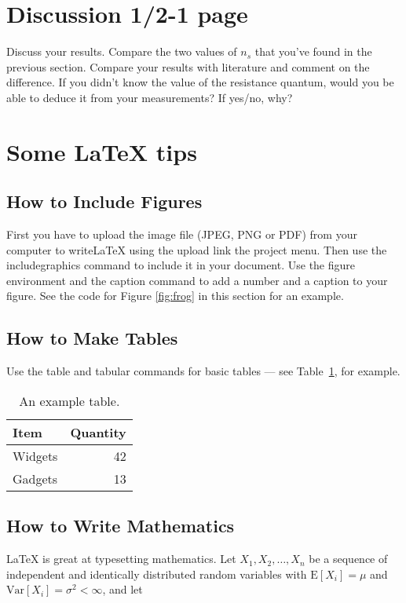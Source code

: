 \documentclass[a4paper]{article}
\begin{document}
\section{Discussion 1/2-1 page}
Discuss your results. Compare the two values of $n_{s}$ that you've found in the previous section. Compare your results with literature and comment on the difference. If you didn't know the value of the resistance quantum, would you be able to deduce it from your measurements? If yes/no, why?

\newpage
\section{Some LaTeX tips}
\label{sec:latex}
\subsection{How to Include Figures}

First you have to upload the image file (JPEG, PNG or PDF) from your computer to writeLaTeX using the upload link the project menu. Then use the includegraphics command to include it in your document. Use the figure environment and the caption command to add a number and a caption to your figure. See the code for Figure \ref{fig:frog} in this section for an example.



\subsection{How to Make Tables}

Use the table and tabular commands for basic tables --- see Table~\ref{tab:widgets}, for example.

\begin{table}
\centering
\begin{tabular}{l|r}
Item & Quantity \\\hline
Widgets & 42 \\
Gadgets & 13
\end{tabular}
\caption{\label{tab:widgets}An example table.}
\end{table}

\subsection{How to Write Mathematics}

\LaTeX{} is great at typesetting mathematics. Let $X_1, X_2, \ldots, X_n$ be a sequence of independent and identically distributed random variables with $\text{E}[X_i] = \mu$ and $\text{Var}[X_i] = \sigma^2 < \infty$, and let
\end{document}
